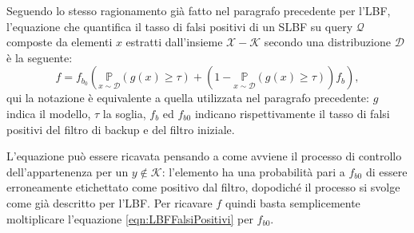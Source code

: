 \documentclass[../../main.tex]{subfiles}
\begin{document}
    Seguendo lo stesso ragionamento già fatto nel paragrafo precedente per l'LBF, l'equazione che quantifica il tasso di falsi positivi di un SLBF su query $\mathcal{Q}$ composte da elementi $x$ estratti dall'insieme $\mathcal{X} - \mathcal{K}$ secondo una distribuzione $\mathcal{D}$ è la seguente: 
    \begin{equation}
        f = f_{b_0}\left(\underset{x \sim \mathcal{D}}{\mathbb{P}}(g(x) \geq \tau) + (1 - \underset{x \sim \mathcal{D}}{\mathbb{P}}(g(x) \geq \tau))f_b\right),
        \label{eqn:SLBFFalsiPositivi}
    \end{equation}
    qui la notazione è equivalente a quella utilizzata nel paragrafo precedente: $g$ indica il modello, $\tau$ la soglia, $f_b$ ed $f_{b0}$ indicano rispettivamente il tasso di falsi positivi del filtro di backup e del filtro iniziale.

    L'equazione può essere ricavata pensando a come avviene il processo di controllo dell'appartenenza per un $y \notin \mathcal{K}$: l'elemento ha una probabilità pari a $f_{b0}$ di essere erroneamente etichettato come positivo dal filtro, dopodiché il processo si svolge come già descritto per l'LBF. Per ricavare $f$ quindi basta semplicemente moltiplicare l'equazione \ref{eqn:LBFFalsiPositivi} per $f_{b0}$.
\end{document}
